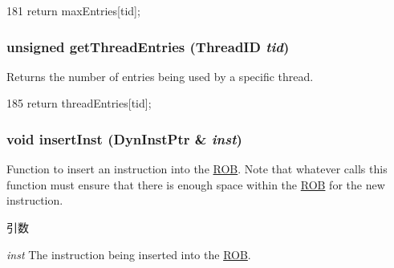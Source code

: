 \begin{DoxyCode}
181     { return maxEntries[tid]; }
\end{DoxyCode}
\hypertarget{classROB_a6461a6d64f301a64dbf720f1290114eb}{
\subsubsection[{getThreadEntries}]{\setlength{\rightskip}{0pt plus 5cm}unsigned getThreadEntries ({\bf ThreadID} {\em tid})}}
\label{classROB_a6461a6d64f301a64dbf720f1290114eb}
Returns the number of entries being used by a specific thread. 


\begin{DoxyCode}
185     { return threadEntries[tid]; }
\end{DoxyCode}
\hypertarget{classROB_aa5f3ce0db8d338ad004f89955f495fef}{
\subsubsection[{insertInst}]{\setlength{\rightskip}{0pt plus 5cm}void insertInst ({\bf DynInstPtr} \& {\em inst})}}
\label{classROB_aa5f3ce0db8d338ad004f89955f495fef}
Function to insert an instruction into the \hyperlink{classROB}{ROB}. Note that whatever calls this function must ensure that there is enough space within the \hyperlink{classROB}{ROB} for the new instruction. 
\begin{DoxyParams}{引数}
\item[{\em inst}]The instruction being inserted into the \hyperlink{classROB}{ROB}. \end{DoxyParams}



